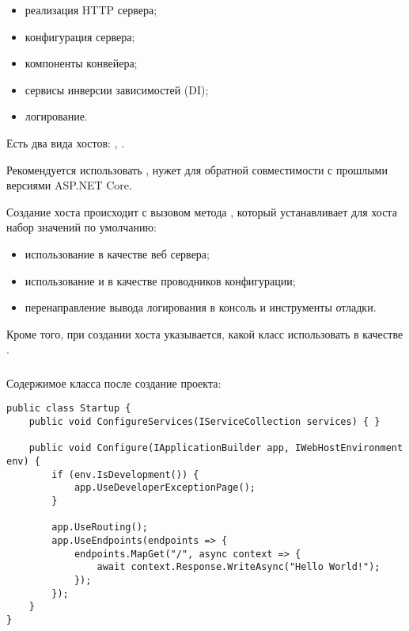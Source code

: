 \documentclass[a4paper,14pt]{extarticle}
\begin{document}
\begin{itemize}
    \item реализация HTTP сервера;
    \item конфигурация сервера;
    \item компоненты конвейера;
    \item сервисы инверсии зависимостей (DI);
    \item логирование.
\end{itemize}

Есть два вида хостов: , .

Рекомендуется использовать ,  нужет для обратной совместимости с прошлыми версиями ASP.NET Core.

Создание хоста происходит с вызовом метода , который
устанавливает для хоста набор значений по умолчанию:

\begin{itemize}
    \item использование  в качестве веб сервера;
    \item использование  и
          в качестве проводников конфигурации;
    \item перенаправление вывода логирования в консоль и инструменты отладки.
\end{itemize}

Кроме того, при создании хоста указывается, какой класс использовать в качестве
.

\subsubsection{}

Содержимое класса  после создание проекта:

\begin{lstlisting}
public class Startup {
    public void ConfigureServices(IServiceCollection services) { }

    public void Configure(IApplicationBuilder app, IWebHostEnvironment env) {
        if (env.IsDevelopment()) {
            app.UseDeveloperExceptionPage();
        }

        app.UseRouting();
        app.UseEndpoints(endpoints => {
            endpoints.MapGet("/", async context => {
                await context.Response.WriteAsync("Hello World!");
            });
        });
    }
}
\end{lstlisting}
\end{document}
